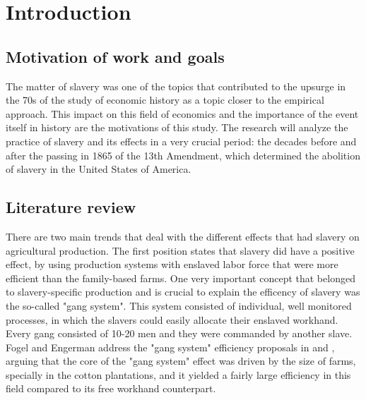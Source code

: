 \documentclass[12pt]{report}
\begin{document}
	\newpage
	\thispagestyle{empty}
	\mbox{}
	


\tableofcontents
\thispagestyle{fancy}

\newpage %
\thispagestyle{empty}
\mbox{}

\listoffigures
\thispagestyle{fancy}

\newpage 
\thispagestyle{empty}
\mbox{}


\listoftables
\thispagestyle{fancy}

\newpage 
\thispagestyle{empty}
\mbox{}


	
\clearpage
{} %

\chapter{Introduction}



\section{Motivation of work and goals}
The matter of slavery was one of the topics that contributed to the upsurge in the 70s of the study of economic history as a topic closer to the empirical approach. This impact on this field of economics and the importance of the event itself in history are the motivations of this study. The research will analyze the practice of slavery and its effects in a very crucial period: the decades before and after the passing in 1865 of the 13th Amendment, which determined the abolition of slavery in the United States of America.
\section{Literature review}
There are two main trends that deal with the different effects that had slavery on agricultural production. The first position states that slavery did have a positive effect, by using production systems with enslaved labor force that were more efficient than the family-based farms. One very important concept that belonged to slavery-specific production and is crucial to explain the efficency of slavery was the so-called "gang system". This system consisted of individual, well monitored processes, in which the slavers could easily allocate their enslaved workhand. Every gang consisted of 10-20 men and they were commanded by another slave. Fogel and Engerman address the "gang system" efficiency proposals in \citet{fogel1995time} and \citet{explaining}, arguing that the core of the "gang system" effect was driven by the size of farms, specially in the cotton plantations, and it yielded a fairly large efficiency in this field compared to its free workhand counterpart.
\end{document}
